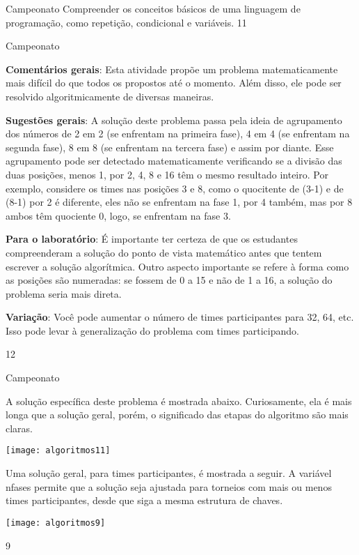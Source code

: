 \begin{objectives}{Campeonato}
{
Compreender os conceitos básicos de uma linguagem de programação, como repetição, condicional e variáveis.
}{1}{1}
\end{objectives}
\begin{sugestions}{Campeonato}
{
\textbf{Comentários gerais}: Esta atividade propõe um problema matematicamente mais difícil do que todos os propostos até o momento. Além disso, ele pode ser resolvido algoritmicamente de diversas maneiras.

\textbf{Sugestões gerais}: A solução deste problema passa pela ideia de agrupamento dos números de 2 em 2 (se enfrentam na primeira fase), 4 em 4 (se enfrentam na segunda fase), 8 em 8 (se enfrentam na tercera fase) e assim por diante. Esse agrupamento pode ser detectado matematicamente verificando se a divisão das duas posições, menos 1, por 2, 4, 8 e 16 têm o mesmo resultado inteiro. Por exemplo, considere os times nas posições 3 e 8, como o quocitente de (3-1) e de (8-1) por 2 é diferente, eles não se enfrentam na fase 1, por 4 também, mas por 8 ambos têm quociente 0, logo, se enfrentam na fase 3.

\textbf{Para o laboratório}: É importante ter certeza de que os estudantes compreenderam a solução do ponto de vista matemático antes que tentem escrever a solução algorítmica. Outro aspecto importante se refere à forma como as posições são numeradas: se fossem de 0 a 15 e não de 1 a 16, a solução do problema seria mais direta.

\textbf{Variação}: Você pode aumentar o número de times participantes para 32, 64, etc. Isso pode levar à generalização do problema com  times participando.
}{1}{2}
\end{sugestions}
\begin{answer}{Campeonato}
{
A solução específica deste problema é mostrada abaixo. Curiosamente, ela é mais longa que a solução geral, porém, o significado das etapas do algoritmo são mais claras.

\centering
\texttt{[image: algoritmos11]}
\justify

Uma solução geral, para  times participantes, é mostrada a seguir. A variável nfases permite que a solução seja ajustada para torneios com mais ou menos times participantes, desde que siga a mesma estrutura de chaves.

\centering
\texttt{[image: algoritmos9]}
}{9}
\end{answer}

